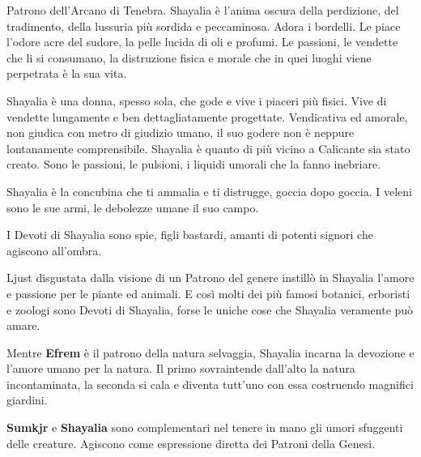 \begin{multicols}{2}
Patrono dell'Arcano di Tenebra. Shayalia è l'anima oscura della perdizione, del tradimento, della lussuria più sordida e peccaminosa. Adora i bordelli. Le piace l'odore acre del sudore, la pelle lucida di oli e profumi. Le passioni, le vendette che li si consumano, la distruzione fisica e morale che in quei luoghi viene perpetrata è la sua vita.

Shayalia è una donna, spesso sola, che gode e vive i piaceri più fisici. Vive di vendette lungamente e ben dettagliatamente progettate. Vendicativa ed amorale, non giudica con metro di giudizio umano, il suo godere non è neppure lontanamente comprensibile. Shayalia è quanto di più vicino a Calicante sia stato creato. Sono le passioni, le pulsioni, i liquidi umorali che la fanno inebriare.

Shayalia è la concubina che ti ammalia e ti distrugge, goccia dopo goccia. I veleni sono le sue armi, le debolezze umane il suo campo.

I Devoti di Shayalia sono spie, figli bastardi, amanti di potenti signori che agiscono all'ombra.

Ljust disgustata dalla visione di un Patrono del genere instillò in Shayalia l'amore e passione per le piante ed animali. E così molti dei più famosi botanici, erboristi e zoologi sono Devoti di Shayalia, forse le uniche cose che Shayalia veramente può amare.

\medskip

\begin{narratore}
Mentre \textbf{Efrem} è il patrono della natura selvaggia, Shayalia incarna la devozione e l'amore umano per la natura. Il primo sovraintende dall'alto la natura incontaminata, la seconda si cala e diventa tutt'uno con essa costruendo magnifici giardini.

\medskip

\textbf{Sumkjr} e \textbf{Shayalia} sono complementari nel tenere in mano gli umori sfuggenti delle creature. Agiscono come espressione diretta dei Patroni della Genesi.

\end{narratore}

\medskip


\end{multicols}
